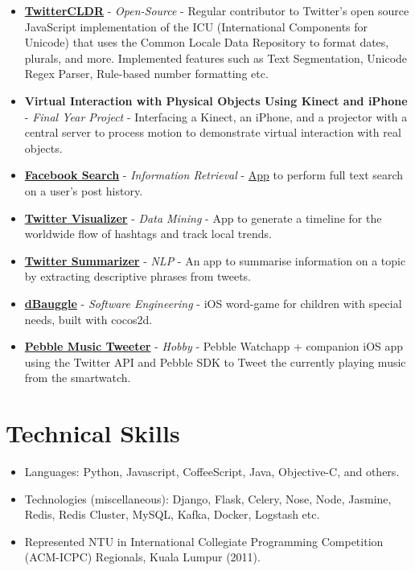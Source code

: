 \begin{itemize}
\item
  \href{https://github.com/twitter/twitter-cldr-js}{\textbf{TwitterCLDR}}
  - \emph{Open-Source} - Regular contributor to Twitter's open source
  JavaScript implementation of the ICU (International Components for
  Unicode) that uses the Common Locale Data Repository to format dates,
  plurals, and more. Implemented features such as Text Segmentation,
  Unicode Regex Parser, Rule-based number formatting etc.
\item
  \textbf{Virtual Interaction with Physical Objects Using Kinect and
  iPhone} - \emph{Final Year Project} - Interfacing a Kinect, an iPhone,
  and a projector with a central server to process motion to demonstrate
  virtual interaction with real objects.
\item
  \href{https://github.com/arnavk/FacebookSearch}{\textbf{Facebook
  Search}} - \emph{Information Retrieval} -
  \href{http://facebook-search.herokuapp.com/}{App} to perform full text
  search on a user's post history.
\item
  \href{https://github.com/arnavk/Twitter-Visualiser}{\textbf{Twitter
  Visualizer}} - \emph{Data Mining} - App to generate a timeline for the
  worldwide flow of hashtags and track local trends.
\item
  \href{https://github.com/arnavk/NLP}{\textbf{Twitter Summarizer}} -
  \emph{NLP} - An app to summarise information on a topic by extracting
  descriptive phrases from tweets.
\item
  \href{https://itunes.apple.com/us/app/dbauggle!/id625981185?mt=8}{\textbf{dBauggle}}
  - \emph{Software Engineering} - iOS word-game for children with
  special needs, built with cocos2d.
\item
  \href{https://github.com/arnavk/Pebble-MusicTweeter}{\textbf{Pebble
  Music Tweeter}} - \emph{Hobby} - Pebble Watchapp + companion iOS app
  using the Twitter API and Pebble SDK to Tweet the currently playing
  music from the smartwatch.
\end{itemize}

\section{Technical Skills}\label{technical-skills}

\begin{itemize}
\tightlist
\item
  Languages: Python, Javascript, CoffeeScript, Java, Objective-C, and
  others.
\item
  Technologies (miscellaneous): Django, Flask, Celery, Nose, Node,
  Jasmine, Redis, Redis Cluster, MySQL, Kafka, Docker, Logstash etc.
\item
  Represented NTU in International Collegiate Programming Competition
  (ACM-ICPC) Regionals, Kuala Lumpur (2011).
\end{itemize}

